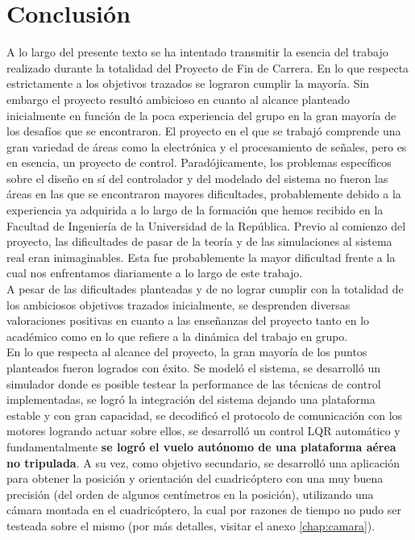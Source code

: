 \documentclass[main]{subfiles}
\begin{document}
\cleardoublepage
{}
{}
\chapter*{Conclusi\'on}

A lo largo del presente texto se ha intentado transmitir la esencia  del trabajo realizado durante la totalidad del Proyecto de Fin de Carrera. En lo que respecta estrictamente a los objetivos trazados se lograron cumplir la mayoría. Sin embargo el proyecto result\'o ambicioso en cuanto al alcance planteado inicialmente en funci\'on de la poca experiencia del grupo en la gran mayor\'ia de los desaf\'ios que se encontraron. El proyecto en el que se trabaj\'o comprende una gran variedad de \'areas como la electr\'onica y el procesamiento de señales, pero es en esencia, un proyecto de control. Parad\'ojicamente, los problemas espec\'ificos sobre el diseño en s\'i del controlador y del modelado del sistema no fueron las \'areas en las que se encontraron mayores dificultades, probablemente debido a la experiencia ya adquirida a lo largo de la formaci\'on que hemos recibido en la Facultad de Ingeniería de la Universidad de la República. Previo al comienzo del proyecto, las dificultades de pasar de la teor\'ia y de las simulaciones al sistema real eran inimaginables. Esta fue probablemente la mayor dificultad frente a la cual nos enfrentamos diariamente a lo largo de este trabajo.\\

A pesar de las dificultades planteadas y de no lograr cumplir con la totalidad de los ambiciosos objetivos trazados inicialmente, se desprenden diversas valoraciones positivas en cuanto a las enseñanzas del proyecto tanto en lo acad\'emico como en lo que refiere a la din\'amica del trabajo en grupo.\\

En lo que respecta al alcance del proyecto, la gran mayoría de los puntos planteados fueron logrados con \'exito. Se modeló el sistema, se desarrolló un simulador donde es posible testear la performance de las técnicas de control implementadas, se logró la integración del sistema dejando una plataforma estable y con gran capacidad, se decodificó el protocolo de comunicación con los motores logrando actuar sobre ellos, se desarrolló un control LQR automático y fundamentalmente \textbf{se logró el vuelo autónomo de una plataforma aérea no tripulada}. A su vez, como objetivo secundario, se desarrolló una aplicación para obtener la posición y orientación del cuadricóptero con una muy buena precisión (del orden de algunos centímetros en la posición), utilizando una cámara montada en el cuadricóptero, la cual por razones de tiempo no pudo ser testeada sobre el mismo (por más detalles, visitar el anexo \ref{chap:camara}).\\
\end{document}
